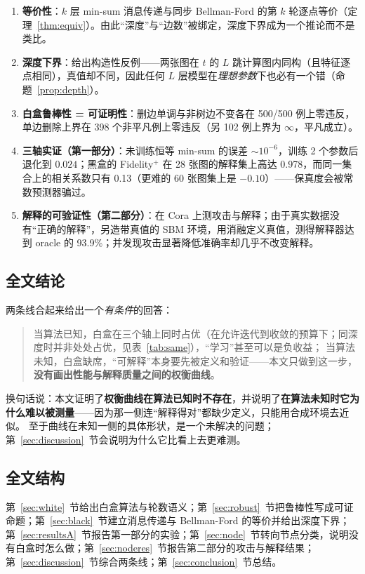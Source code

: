 \begin{enumerate}[leftmargin=1.8em]
\item \textbf{等价性}：$k$ 层 min-sum 消息传递与同步 Bellman-Ford 的第 $k$ 轮逐点等价（定理~\ref{thm:equiv}）。由此“深度”与“边数”被绑定，深度下界成为一个推论而不是类比。
\item \textbf{深度下界}：给出构造性反例——两张图在 $t$ 的 $L$ 跳计算图内同构（且特征逐点相同），真值却不同，因此任何 $L$ 层模型在\emph{理想参数}下也必有一个错（命题~\ref{prop:depth}）。
\item \textbf{白盒鲁棒性 = 可证明性}：删边单调与非树边不变各在 500/500 例上零违反，单边删除上界在 398 个非平凡例上零违反（另 102 例上界为 $\infty$，平凡成立）。
\item \textbf{三轴实证（第一部分）}：未训练恒等 min-sum 的误差 $\sim10^{-6}$，训练 2 个参数后退化到 $0.024$；黑盒的 Fidelity$^+$ 在 28 张图的解释集上高达 0.978，而同一集合上的相关系数只有 0.13（更难的 60 张图集上是 $-0.10$）——保真度会被常数预测器骗过。
\item \textbf{解释的可验证性（第二部分）}：在 Cora 上测攻击与解释；由于真实数据没有“正确的解释”，另造带真值的 SBM 环境，用消融定义真值，测得解释器达到 oracle 的 93.9\%；并发现攻击显著降低准确率却几乎不改变解释。
\end{enumerate}

\subsection{全文结论}

两条线合起来给出一个\emph{有条件}的回答：

\begin{quote}
当算法已知，白盒在三个轴上同时占优（在允许迭代到收敛的预算下；同深度时并非处处占优，见表~\ref{tab:same}），“学习”甚至可以是负收益；
当算法未知，白盒缺席，“可解释”本身要先被定义和验证——本文只做到这一步，\textbf{没有画出性能与解释质量之间的权衡曲线}。
\end{quote}

换句话说：本文证明了\textbf{权衡曲线在算法已知时不存在}，并说明了\textbf{在算法未知时它为什么难以被测量}——因为那一侧连“解释得对”都缺少定义，只能用合成环境去近似。
至于曲线在未知一侧的具体形状，是一个未解决的问题；第~\ref{sec:discussion}~节会说明为什么它比看上去更难测。

\subsection{全文结构}

第~\ref{sec:white}~节给出白盒算法与轮数语义；第~\ref{sec:robust}~节把鲁棒性写成可证命题；第~\ref{sec:black}~节建立消息传递与 Bellman-Ford 的等价并给出深度下界；
第~\ref{sec:resultsA}~节报告第一部分的实验；第~\ref{sec:node}~节转向节点分类，说明没有白盒时怎么做；第~\ref{sec:noderes}~节报告第二部分的攻击与解释结果；
第~\ref{sec:discussion}~节综合两条线；第~\ref{sec:conclusion}~节总结。
